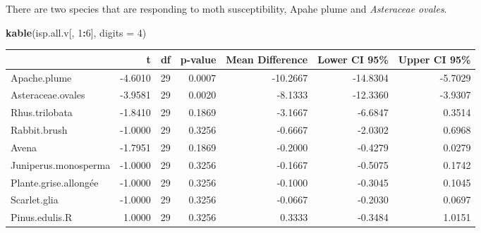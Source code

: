 \documentclass[]{article}
\newenvironment{Shaded}{\begin{snugshade}}{\end{snugshade}}
\newcommand{\KeywordTok}[1]{\textcolor[rgb]{0.13,0.29,0.53}{\textbf{#1}}}
\newcommand{\DataTypeTok}[1]{\textcolor[rgb]{0.13,0.29,0.53}{#1}}
\newcommand{\DecValTok}[1]{\textcolor[rgb]{0.00,0.00,0.81}{#1}}
\newcommand{\StringTok}[1]{\textcolor[rgb]{0.31,0.60,0.02}{#1}}
\newcommand{\ControlFlowTok}[1]{\textcolor[rgb]{0.13,0.29,0.53}{\textbf{#1}}}
\newcommand{\OperatorTok}[1]{\textcolor[rgb]{0.81,0.36,0.00}{\textbf{#1}}}
\newcommand{\NormalTok}[1]{#1}
\begin{document}
\begin{Shaded}
\end{Shaded}

There are two species that are responding to moth susceptibility, Apahe
plume and \emph{Asteraceae ovales}.

\begin{Shaded}
\begin{Highlighting}[]
\KeywordTok{kable}\NormalTok{(isp.all.v[, }\DecValTok{1}\OperatorTok{:}\DecValTok{6}\NormalTok{], }\DataTypeTok{digits =} \DecValTok{4}\NormalTok{)}
\end{Highlighting}
\end{Shaded}

\begin{longtable}[]{@{}lrrrrrr@{}}
\toprule
& t & df & p-value & Mean Difference & Lower CI 95\% & Upper CI
95\%\tabularnewline
\midrule
\endhead
Apache.plume & -4.6010 & 29 & 0.0007 & -10.2667 & -14.8304 &
-5.7029\tabularnewline
Asteraceae.ovales & -3.9581 & 29 & 0.0020 & -8.1333 & -12.3360 &
-3.9307\tabularnewline
Rhus.trilobata & -1.8410 & 29 & 0.1869 & -3.1667 & -6.6847 &
0.3514\tabularnewline
Rabbit.brush & -1.0000 & 29 & 0.3256 & -0.6667 & -2.0302 &
0.6968\tabularnewline
Avena & -1.7951 & 29 & 0.1869 & -0.2000 & -0.4279 &
0.0279\tabularnewline
Juniperus.monosperma & -1.0000 & 29 & 0.3256 & -0.1667 & -0.5075 &
0.1742\tabularnewline
Plante.grise.allongée & -1.0000 & 29 & 0.3256 & -0.1000 & -0.3045 &
0.1045\tabularnewline
Scarlet.glia & -1.0000 & 29 & 0.3256 & -0.0667 & -0.2030 &
0.0697\tabularnewline
Pinus.edulis.R & 1.0000 & 29 & 0.3256 & 0.3333 & -0.3484 &
1.0151\tabularnewline
\bottomrule
\end{longtable}
\end{document}
